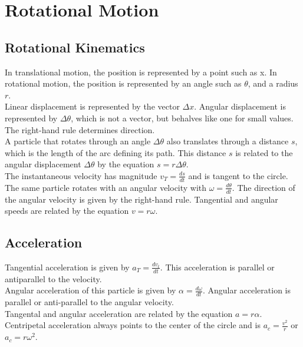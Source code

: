 \section{Rotational Motion}

\subsection{Rotational Kinematics}
In translational motion, the position is represented by a point such as x. In rotational motion, the position is represented by an angle such as $\theta$, and a radius $r$.\\

Linear displacement is represented by the vector $\Delta x$. Angular displacement is represented by $\Delta \theta$, which is not a vector, but behalves like one for small values. The right-hand rule determines direction. \\

A particle that rotates through an angle $\Delta\theta$ also translates through a distance $s$, which is the length of the arc defining its path. This distance $s$ is related to the angular displacement $\Delta\theta$ by the equation $s=r\Delta\theta$. \\

The instantaneous velocity has magnitude $v_T=\frac{ds}{dt}$ and is tangent to the circle. The same particle rotates with an angular velocity with $\omega=\frac{d\theta}{dt}$. The direction of the angular velocity is given by the right-hand rule. Tangential and angular speeds are related by the equation $v=r\omega$.\\

\subsection{Acceleration}
Tangential acceleration is given by $a_T=\frac{dv_t}{dt}$. This acceleration is parallel or antiparallel to the velocity.\\

Angular acceleration of this particle is given by $\alpha=\frac{d\omega}{dt}$. Angular acceleration is parallel or anti-parallel to the angular velocity.\\

Tangental and angular acceleration are related by the equation $a=r\alpha$.\\

Centripetal acceleration always points to the center of the circle and is $a_c=\frac{v^2}{r}$ or $a_c=r\omega^2$.

